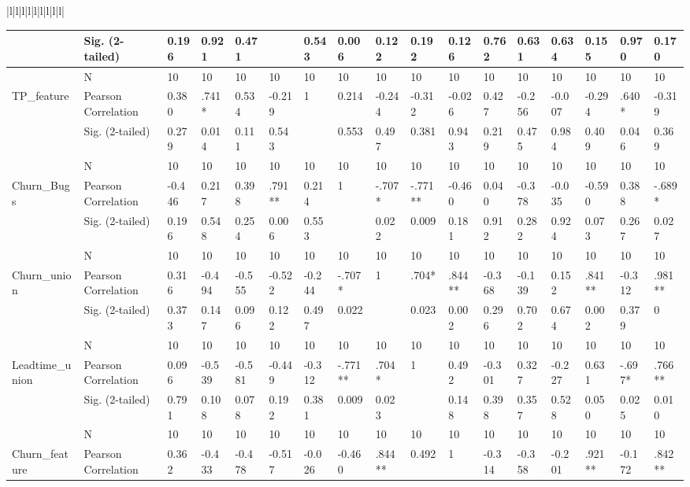 \documentclass[UKenglish]{ifimaster}  %
\begin{document}
\begin{table}[!htbp]
\begin{adjustwidth}{-2.5cm}{}
{\begin{tabular}{|l|l|l|l|l|l|l|l|l|}
\begin{tabular}{ | l | l | l | l | l | l | l | l | l | l | l | l | l | l | l | l | l | }
	 & Sig. (2-tailed) & 0.196 & 0.921 & 0.471 &  & 0.543 & 0.006 & 0.122 & 0.192 & 0.126 & 0.762 & 0.631 & 0.634 & 0.155 & 0.970 & 0.170\\ \hline
	 & N & 10 & 10 & 10 & 10 & 10 & 10 & 10 & 10 & 10 & 10 & 10 & 10 & 10 & 10 & 10 \\ \hline
	TP\_feature & Pearson Correlation & 0.380 & .741* & 0.534 & -0.219 & 1 & 0.214 & -0.244 & -0.312 & -0.026 & 0.427 & -0.256 & -0.007 & -0.294 & .640* & -0.319\\ \hline
	 & Sig. (2-tailed) & 0.279 & 0.014 & 0.111 & 0.543 &  & 0.553 & 0.497 & 0.381 & 0.943 & 0.219 & 0.475 & 0.984 & 0.409 & 0.046 & 0.369\\ \hline
	 & N & 10 & 10 & 10 & 10 & 10 & 10 & 10 & 10 & 10 & 10 & 10 & 10 & 10 & 10 & 10 \\ \hline
	Churn\_Bugs & Pearson Correlation & -0.446 & 0.217 & 0.398 & .791** & 0.214 & 1 & -.707* & -.771** & -0.460 & 0.040 & -0.378 & -0.035 & -0.590 & 0.388 & -.689* \\ \hline
	 & Sig. (2-tailed) & 0.196 & 0.548 & 0.254 & 0.006 & 0.553 &  & 0.022 & 0.009 & 0.181 & 0.912 & 0.282 & 0.924 & 0.073 & 0.267 & 0.027\\ \hline
	 & N & 10 & 10 & 10 & 10 & 10 & 10 & 10 & 10 & 10 & 10 & 10 & 10 & 10 & 10 & 10 \\ \hline
	Churn\_union & Pearson Correlation & 0.316 & -0.494 & -0.555 & -0.522 & -0.244 & -.707* & 1 & .704* & .844** & -0.368 & -0.139 & 0.152 & .841** & -0.312 & .981** \\ \hline
	 & Sig. (2-tailed) & 0.373 & 0.147 & 0.096 & 0.122 & 0.497 & 0.022 &  & 0.023 & 0.002 & 0.296 & 0.702 & 0.674 & 0.002 & 0.379 & 0\\ \hline
	 & N & 10 & 10 & 10 & 10 & 10 & 10 & 10 & 10 & 10 & 10 & 10 & 10 & 10 & 10 & 10 \\ \hline
	Leadtime\_union & Pearson Correlation & 0.096 & -0.539 & -0.581 & -0.449 & -0.312 & -.771** & .704* & 1 & 0.492 & -0.301 & 0.327 & -0.227 & 0.631 & -.697* & .766** \\ \hline
	 & Sig. (2-tailed) & 0.791 & 0.108 & 0.078 & 0.192 & 0.381 & 0.009 & 0.023 &  & 0.148 & 0.398 & 0.357 & 0.528 & 0.050 & 0.025 & 0.010\\ \hline
	 & N & 10 & 10 & 10 & 10 & 10 & 10 & 10 & 10 & 10 & 10 & 10 & 10 & 10 & 10 & 10 \\ \hline
	Churn\_feature & Pearson Correlation & 0.362 & -0.433 & -0.478 & -0.517 & -0.026 & -0.460 & .844** & 0.492 & 1 & -0.314 & -0.358 & -0.201 & .921** & -0.172 & .842** \\ \hline

\end{tabular}
\end{tabular}}
\end{adjustwidth}
\end{table}
\end{document}
